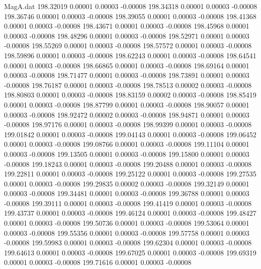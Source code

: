 \begin{filecontents}{MagA.dat}
 198.32019    0.00001    0.00003   -0.00008
 198.34318    0.00001    0.00003   -0.00008
 198.36746    0.00001    0.00003   -0.00008
 198.39055    0.00001    0.00003   -0.00008
 198.41368    0.00001    0.00003   -0.00008
 198.43671    0.00001    0.00003   -0.00008
 198.45968    0.00001    0.00003   -0.00008
 198.48296    0.00001    0.00003   -0.00008
 198.52971    0.00001    0.00003   -0.00008
 198.55269    0.00001    0.00003   -0.00008
 198.57572    0.00001    0.00003   -0.00008
 198.59896    0.00001    0.00003   -0.00008
 198.62243    0.00001    0.00003   -0.00008
 198.64541    0.00001    0.00003   -0.00008
 198.66865    0.00001    0.00003   -0.00008
 198.69164    0.00001    0.00003   -0.00008
 198.71477    0.00001    0.00003   -0.00008
 198.73891    0.00001    0.00003   -0.00008
 198.76187    0.00001    0.00003   -0.00008
 198.78513    0.00002    0.00003   -0.00008
 198.80803    0.00001    0.00003   -0.00008
 198.83159    0.00002    0.00003   -0.00008
 198.85419    0.00001    0.00003   -0.00008
 198.87799    0.00001    0.00003   -0.00008
 198.90057    0.00001    0.00003   -0.00008
 198.92472    0.00002    0.00003   -0.00008
 198.94871    0.00001    0.00003   -0.00008
 198.97176    0.00001    0.00003   -0.00008
 198.99399    0.00001    0.00003   -0.00008
 199.01842    0.00001    0.00003   -0.00008
 199.04143    0.00001    0.00003   -0.00008
 199.06452    0.00001    0.00003   -0.00008
 199.08766    0.00001    0.00003   -0.00008
 199.11104    0.00001    0.00003   -0.00008
 199.13505    0.00001    0.00003   -0.00008
 199.15800    0.00001    0.00003   -0.00008
 199.18243    0.00001    0.00003   -0.00008
 199.20488    0.00001    0.00003   -0.00008
 199.22811    0.00001    0.00003   -0.00008
 199.25122    0.00001    0.00003   -0.00008
 199.27535    0.00001    0.00003   -0.00008
 199.29835    0.00002    0.00003   -0.00008
 199.32149    0.00001    0.00003   -0.00008
 199.34481    0.00001    0.00003   -0.00008
 199.36788    0.00001    0.00003   -0.00008
 199.39111    0.00001    0.00003   -0.00008
 199.41419    0.00001    0.00003   -0.00008
 199.43737    0.00001    0.00003   -0.00008
 199.46124    0.00001    0.00003   -0.00008
 199.48427    0.00001    0.00003   -0.00008
 199.50736    0.00001    0.00003   -0.00008
 199.53064    0.00001    0.00003   -0.00008
 199.55356    0.00001    0.00003   -0.00008
 199.57758    0.00001    0.00003   -0.00008
 199.59983    0.00001    0.00003   -0.00008
 199.62304    0.00001    0.00003   -0.00008
 199.64613    0.00001    0.00003   -0.00008
 199.67025    0.00001    0.00003   -0.00008
 199.69319    0.00001    0.00003   -0.00008
 199.71616    0.00001    0.00003   -0.00008

\end{filecontents}
